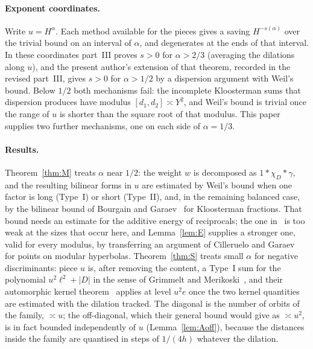 \documentclass[11pt,a4paper]{article}
\begin{document}
\paragraph{Exponent coordinates.} Write $u=H^{\alpha}$. Each method available for the pieces gives a saving $H^{-s(\alpha)}$ over the trivial bound on an interval of $\alpha$,
and degenerates at the ends of that interval. In these coordinates part~III proves $s>0$ for $\alpha>2/3$ (averaging the dilations along $u$), and the present author's
extension of that theorem, recorded in the revised part~III, gives $s>0$ for $\alpha>1/2$ by a dispersion argument with Weil's bound. Below $1/2$ both mechanisms fail: the
incomplete Kloosterman sums that dispersion produces have modulus $[d_1,d_2]\asymp Y^2$, and Weil's bound is trivial once the range of $u$ is shorter than the square root of
that modulus. This paper supplies two further mechanisms, one on each side of $\alpha=1/3$.

\paragraph{Results.} Theorem~\ref{thm:M} treats $\alpha$ near $1/2$: the weight $w$ is decomposed as $1*\chi_D*\gamma$, and the resulting bilinear forms in $u$ are estimated by
Weil's bound when one factor is long (Type~I) or short (Type~II), and, in the remaining balanced case, by the bilinear bound of Bourgain and Garaev~\cite{BourgainGaraev2014}
for Kloosterman fractions. That bound needs an estimate for the additive energy of reciprocals; the one in~\cite{BourgainGaraev2014} is too weak at the sizes that occur here,
and Lemma~\ref{lem:E} supplies a stronger one, valid for every modulus, by transferring an argument of Cilleruelo and Garaev~\cite{CilleruelooGaraev2011} for points on modular
hyperbolas. Theorem~\ref{thm:S} treats small $\alpha$ for negative discriminants: piece $u$ is, after removing the content, a Type~I sum for the polynomial $u^2\ell^2+|D|$ in
the sense of Grimmelt and Merikoski~\cite{GrimmeltMerikoski2025quadratic}, and their automorphic kernel theorem~\cite{GrimmeltMerikoski2025kernel} applies at level $u^2e$ once
the two kernel quantities are estimated with the dilation tracked. The diagonal is the number of orbits of the family, $\asymp u$; the off-diagonal, which their general bound
would give as $\asymp u^2$, is in fact bounded independently of $u$ (Lemma~\ref{lem:Aoff}), because the distances inside the family are quantised in steps of $1/(4h)$ whatever
the dilation.
\end{document}
